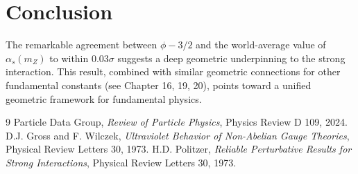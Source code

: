 \section{Conclusion}

The remarkable agreement between $\phi - 3/2$ and the world-average value of $\alpha_s(m_Z)$ to within $0.03\sigma$ suggests a deep geometric underpinning to the strong interaction. This result, combined with similar geometric connections for other fundamental constants (see Chapter 16, 19, 20), points toward a unified geometric framework for fundamental physics.


\begin{thebibliography}{9}
 Particle Data Group, \textit{Review of Particle Physics}, Physics Review D 109, 2024.
 D.J. Gross and F. Wilczek, \textit{Ultraviolet Behavior of Non-Abelian Gauge Theories}, Physical Review Letters 30, 1973.
 H.D. Politzer, \textit{Reliable Perturbative Results for Strong Interactions}, Physical Review Letters 30, 1973.
\end{thebibliography}
